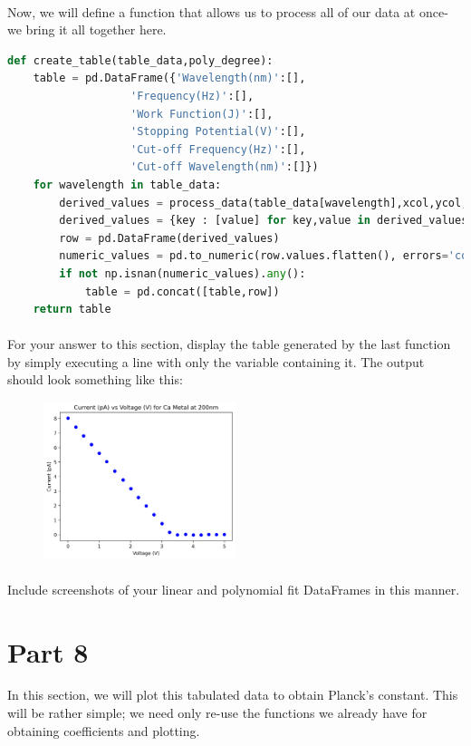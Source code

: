 \documentclass{journal}
\begin{document}
\paragraph{}
Now, we will define a function that allows us to process all of our data at once- we bring it all together here.
\begin{lstlisting}[language=python]
def create_table(table_data,poly_degree):
    table = pd.DataFrame({'Wavelength(nm)':[],
                   'Frequency(Hz)':[],
                   'Work Function(J)':[],
                   'Stopping Potential(V)':[],
                   'Cut-off Frequency(Hz)':[],
                   'Cut-off Wavelength(nm)':[]})
    for wavelength in table_data:
        derived_values = process_data(table_data[wavelength],xcol,ycol,wavelength,poly_degree)
        derived_values = {key : [value] for key,value in derived_values.items()}
        row = pd.DataFrame(derived_values)
        numeric_values = pd.to_numeric(row.values.flatten(), errors='coerce')
        if not np.isnan(numeric_values).any():
            table = pd.concat([table,row])
    return table
\end{lstlisting}
\paragraph{}
For your answer to this section, display the table generated by the last function by simply executing a line with only the variable containing it. The output should look something like this:
\begin{figure}[H]
    \centering
    \includegraphics[width=0.5\textwidth]{./Ca_200nm.png}
\end{figure}
\paragraph{}
Include screenshots of your linear and polynomial fit DataFrames in this manner.

\section*{Part 8}
In this section, we will plot this tabulated data to obtain Planck's constant. This will be rather simple; we need only re-use the functions we already have for obtaining coefficients and plotting.
\end{document}
